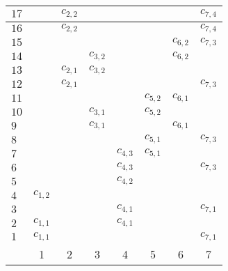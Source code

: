 \begin{center}
\begin{tabular}{l|c|c|c|c|c|c|c}
  \hline
  $17$ & & \cellcolor{Tan}$c_{2, 2}$  & & & & &  \cellcolor{light-gray}$c_{7, 4}$ \\
  \hline
  $16$ & & \cellcolor{light-gray}$c_{2, 2}$  & & & & & \cellcolor{Tan}$c_{7, 4}$  \\
  \hline
  $15$ & &   &   & & & \cellcolor{BurntOrange}$c_{6, 2}$  & \cellcolor{light-gray}$c_{7, 3}$  \\
  \hline
  $14$ & &   & \cellcolor{BurntOrange}$c_{3, 2}$  & & & \cellcolor{light-gray}$c_{6, 2}$  &   \\
  \hline
  $13$ & & \cellcolor{BurntOrange}$c_{2, 1}$  & \cellcolor{light-gray}$c_{3, 2}$  & & &   &   \\
  \hline
  $12$ & & \cellcolor{light-gray}$c_{2, 1}$  &   & & &   & \cellcolor{BurntOrange}$c_{7, 3}$  \\
  \hline
  $11$ & & &  & & \cellcolor{ForestGreen}$c_{5, 2}$  & \cellcolor{light-gray}$c_{6, 1}$ &\\
  \hline
  $10$ & & & \cellcolor{ForestGreen}$c_{3, 1}$  & & \cellcolor{light-gray}$c_{5, 2}$  &  &\\
  \hline
  $9$ & & & \cellcolor{light-gray}$c_{3, 1} $ & &   & \cellcolor{ForestGreen}$c_{6, 1}$ &\\
  \hline
  $8$ & & & & & \cellcolor{Fuchsia}$c_{5, 1}$ & & \cellcolor{light-gray}$c_{7, 3}$\\
  \hline
  $7$ & & & & \cellcolor{Fuchsia}$c_{4, 3}$ & \cellcolor{light-gray}$c_{5, 1}$ & & \\
  \hline
  $6$ & & & & \cellcolor{light-gray}$c_{4, 3}$ & & & \cellcolor{Fuchsia}$c_{7, 3}$\\
  \hline
  $5$ & \cellcolor{Blue}{\color{white} $c_{1, 2}$} & & & \cellcolor{light-gray}$c_{4, 2}$ & & & \\
  \hline
  $4$ & \cellcolor{light-gray}$c_{1, 2}$ & & & \cellcolor{Blue}{\color{white}$c_{4, 2}$} & & & \\
  \hline
  $3$ & & & & \cellcolor{BrickRed}$c_{4, 1}$ & & & \cellcolor{light-gray}$c_{7, 1}$\\
  \hline
  $2$ & \cellcolor{BrickRed}$c_{1, 1}$ & & & \cellcolor{light-gray}$c_{4, 1}$ & & &  \\
  \hline
  $1$ & \cellcolor{light-gray}$c_{1, 1}$ & & & & & &  \cellcolor{BrickRed}$c_{7, 1}$\\
  \hline
  & 1 & 2 & 3 & 4 & 5 & 6 & 7
\end{tabular}
\end{center}

